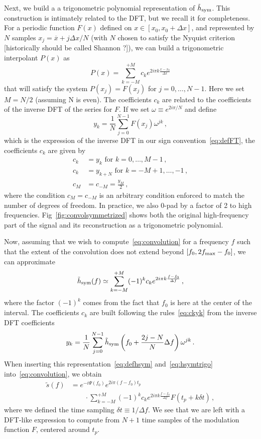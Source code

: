 \documentclass[aps,showpacs,twocolumn,
prd,superscriptaddress,nofootinbib]{revtex4-1}
\newcommand{\be}{\begin{equation}}
\newcommand{\ee}{\end{equation}}
\newcommand{\ov}[1]{\overline{#1}}
\newcommand{\nn}{\nonumber}
\newcommand{\SM}[1]{{\color{Red} #1}}
\begin{document}
Next, we build a a trigonometric polynomial representation of $\tilde{h}_{\rm sym }$. This construction is intimately related to the DFT, but we recall it for completeness. For a periodic function $F(x)$ defined on $x\in [x_{0}, x_{0} + \Delta x]$, and represented by $N$ samples $x_{j} = \ov{x} + j \Delta x/N$ (with $N$ chosen to satisfy the Nyquist criterion \SM{[historically should be called Shannon ?]}), we can build a trigonometric interpolant $P(x)$ as
\be
	P(x) = \sum\limits_{k=-M}^{+M} c_{k} e^{2i\pi k \frac{x-x_{0}}{\Delta x}}
\ee
that will satisfy the system $P(x_{j}) = F(x_{j})$ for $j=0,\dots, N-1$. Here we set $M=N/2$ (assuming N is even). The coefficients $c_{k}$ are related to the coefficients of the inverse DFT of the series for $F$. If we set $\omega \equiv e^{2i\pi/N}$ and define
\be
	y_{k} = \frac{1}{N} \sum\limits_{j=0}^{N-1} F(x_{j}) \omega^{jk} \,,
\ee
which is the expression of the inverse DFT in our sign convention~\eqref{eq:defFT}, the coefficients $c_{k}$ are given by
\begin{align}\label{eq:ckyk}
	c_{k} &= y_{k} \text{ for } k=0,\dots, M-1 \,, \nn\\
	c_{k} &= y_{k+N} \text{ for } k=-M+1,\dots, -1 \,, \nn\\
	c_{M} &= c_{-M} = \frac{y_{M}}{2} \,,
\end{align}
where the condition $c_{M} = c_{-M}$ is an arbitrary condition enforced to match the number of degrees of freedom. In practice, we also 0-pad by a factor of 2 to high frequencies. Fig~\ref{fig:convolsymmetrized} shows both the original high-frequency part of the signal and its reconstruction as a trigonometric polynomial.

Now, assuming that we wish to compute~\eqref{eq:convolution} for a frequency $f$ such that the extent of the convolution does not extend beyond $[f_{0}, 2f_{\rm max} - f_{0}]$, we can approximate
\be\label{eq:hsymtrigo}
	\tilde{h}_{\rm sym } (f) \simeq \sum\limits_{k=-M}^{+M} (-1)^{k} c_{k} e^{2i\pi k \frac{f-f_{0}}{\Delta f}} \,,
\ee
where the factor $(-1)^{k}$ comes from the fact that $f_{0}$ is here at the center of the interval. The coefficients $c_{k}$ are built following the rules~\eqref{eq:ckyk} from the inverse DFT coefficients
\be\label{eq:ykDFT}
	y_{k} = \frac{1}{N} \sum\limits_{j=0}^{N-1} \tilde{h}_{\rm sym}\left( f_{0} + \frac{2j - N}{N} \Delta f \right) \omega^{jk} \,.
\ee
When inserting this representation~\eqref{eq:defhsym} and~\eqref{eq:hsymtrigo} into~\eqref{eq:convolution}, we obtain
\begin{align}\label{eq:resultdirectconvol}
	\tilde{s}(f) &= e^{-i \Psi(f_{0})} e^{2i\pi (f-f_{0}) t_{p}} \nn\\
	& \qquad \cdot\sum\limits_{k=-M}^{+M} (-1)^{k} c_{k} e^{2i\pi k \frac{f-f_{0}}{\Delta f}} F(t_{p} + k\delta t) \,, 
\end{align}
where we defined the time sampling $\delta t \equiv 1/\Delta f$. We see that we are left with a DFT-like expression to compute from $N+1$ time samples of the modulation function $F$, centered around $t_{p}$.
\end{document}
